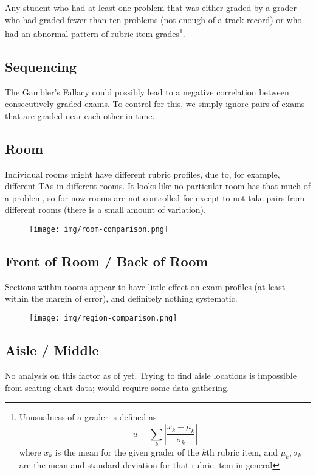 \documentclass{article}
\begin{document}
        Any student who had at least one problem that was either graded by a grader who had graded fewer
            than ten problems (not enough of a track record) or who had an abnormal pattern of rubric item
            grades\footnote{Unusualness of a grader is defined as
                $$u = \sum_k \left|\frac{x_k - \mu_k}{\sigma_k}\right|$$ where $x_k$ is the mean for the 
                given grader of the $k$th rubric item, and $\mu_k, \sigma_k$ are the mean and standard
                deviation for that rubric item in general}.
    \subsection{Sequencing}
        The Gambler's Fallacy could possibly lead to a negative correlation between consecutively graded
            exams. To control for this, we simply ignore pairs of exams that are graded near each other in
            time.
    \subsection{Room}
        Individual rooms might have different rubric profiles, due to, for example, different TAs in
            different rooms. It looks like no particular room has that much of a problem, so for now
            rooms are not controlled for except to not take pairs from different rooms (there is a
            small amount of variation).
        \begin{figure}[h!]
            \centering
            \texttt{[image: img/room-comparison.png]}
        \end{figure}
    \subsection{Front of Room / Back of Room}
        Sections within rooms appear to have little effect on exam profiles (at least within the
            margin of error), and definitely nothing systematic.
        \begin{figure}[h!]
            \centering
            \texttt{[image: img/region-comparison.png]}
        \end{figure}
    \subsection{Aisle / Middle}
        No analysis on this factor as of yet. Trying to find aisle locations is impossible from
            seating chart data; would require some data gathering.
\end{document}
